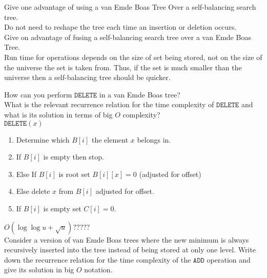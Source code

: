 \documentclass[11pt,a4paper]{article}
\begin{document}
\qpartnb Give one advantage of using a van Emde Boas Tree Over a self-balancing search tree.\\

\apartnb Do not need to reshape the tree each time an insertion or deletion occurs.\\

\qpartnb Give on advantage of fusing a self-balancing search tree over a van Emde Boas Tree.\\

\apartnb Run time for operations depends on the size of set being stored, not on the size of the universe the set is taken from. Thus, if the set is much smaller than the universe then a self-balancing tree should be quicker.

\question
How can you perform $\mathtt{DELETE}$ in a van Emde Boas tree?\\
What is the relevant recurrence relation for the time complexity of $\mathtt{DELETE}$ and what is its solution in terms of big $O$ complexity?\\

\ansnb
$\mathtt{DELETE}(x)$
\begin{enumerate}
	\item Determine which $B[i]$ the element $x$ belongs in.
	\item If $B[i]$ is empty then stop.
	\item Else If $B[i]$ is root set $B[i][x]=0$ (adjusted for offset)
	\item Else delete $x$ from $B[i]$ adjusted for offset.
	\item If $B[i]$ is empty set $C[i]=0$.
\end{enumerate}
$O(\log\log u+\sqrt{u})?????$\\

\question
Consider a version of van Emde Boas trees where the new minimum is always recursively inserted into the tree instead of being stored at only one level. Write down the recurrence relation for the time complexity of the $\mathtt{ADD}$ operation and give its solution in big $O$ notation.\\

\ans
\end{document}
